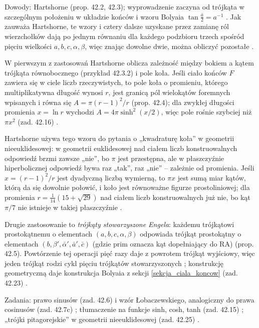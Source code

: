 Dowody: Hartshorne \cite[s. 406--407]{hartshorne_2000} (prop. 42.2, 42.3); wyprowadzenie zaczyna od trójkąta w szczególnym położeniu w układzie końców i wzoru Bolyaia $\tan\tfrac{\bar a}{2} = a^{-1}$ \cite[s. 404--405]{hartshorne_2000}. %
Jak zauważa Hartshorne, te wzory i cztery dalsze uzyskane przez zamianę ról wierzchołków dają po jednym równaniu dla każdego podzbioru trzech spośród pięciu wielkości $a, b, c, \alpha, \beta$, więc znając dowolne dwie, można obliczyć pozostałe \cite[s. 407]{hartshorne_2000}. %

W pierwszym z zastosowań Hartshorne oblicza zależność między bokiem a kątem trójkąta równobocznego (przykład 42.3.2) i pole koła. %
Jeśli ciało końców $F$ zawiera się w ciele liczb rzeczywistych, to pole koła o promieniu, którego multiplikatywna długość wynosi $r$, jest granicą pól wielokątów foremnych wpisanych i równa się $A = \pi(r-1)^2/r$ \cite[s. 407--409]{hartshorne_2000} (prop. 42.4); dla zwykłej długości promienia $x = \ln r$ wychodzi $A = 4\pi\sinh^2(x/2)$, więc pole rośnie szybciej niż $\pi x^2$ (zad. 42.16) \cite[s. 413]{hartshorne_2000}. %

Hartshorne \cite[s. 409]{hartshorne_2000} używa tego wzoru do pytania o „kwadraturę koła'' w geometrii nieeuklidesowej: w geometrii euklidesowej nad ciałem liczb konstruowalnych odpowiedź brzmi zawsze „nie'', bo $\pi$ jest przestępna, ale w płaszczyźnie hiperbolicznej odpowiedź bywa raz „tak'', raz „nie'' -- zależnie od promienia. %
Jeśli $x = (r-1)^2/r$ jest dyadyczną liczbą wymierną, to $\pi x$ jest sumą miar kątów, którą da się dowolnie połowić, i koło jest równoważne figurze prostoliniowej; dla promienia $r = \tfrac{1}{14}(15+\sqrt{29})$ nad ciałem liczb konstruowalnych już nie, bo kąt $\pi/7$ nie istnieje w takiej płaszczyźnie \cite[s. 409]{hartshorne_2000}. %

Drugie zastosowanie to \emph{trójkąty stowarzyszone Engela}: każdemu trójkątowi prostokątnemu o elementach $(a, b, c, \alpha, \beta)$ odpowiada trójkąt prostokątny o elementach $(b, \beta', \bar\alpha', \bar a', \bar c)$ (gdzie prim oznacza kąt dopełniający do $\mathrm{RA}$) \cite[s. 409--410]{hartshorne_2000} (prop. 42.5). %
Powtórzenie tej operacji pięć razy daje z powrotem trójkąt wyjściowy, więc jeden trójkąt rodzi cykl pięciu trójkątów stowarzyszonych \cite[s. 411]{hartshorne_2000}; konstrukcję geometryczną daje konstrukcja Bolyaia z sekcji \ref{sekcja_ciala_koncow} (zad. 42.23) \cite[s. 411, 414]{hartshorne_2000}. %
%

Zadania: prawo sinusów (zad. 42.6) i wzór Łobaczewskiego, analogiczny do prawa cosinusów (zad. 42.7c) \cite[s. 411--412]{hartshorne_2000}; tłumaczenie na funkcje sinh, cosh, tanh (zad. 42.15) \cite[s. 413]{hartshorne_2000}; „trójki pitagorejskie'' w geometrii nieeuklidesowej (zad. 42.25) \cite[s. 415]{hartshorne_2000}. %

